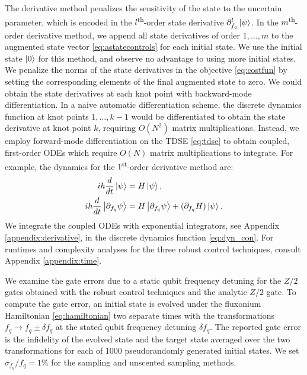 The derivative method penalizes the sensitivity of the state
to the uncertain parameter, which is encoded in the $l$\textsuperscript{th}-order
state derivative $\partial_{f_{q}}^{l} \ket{\psi}$. In the $m$\textsuperscript{th}-order
derivative method, we append all state derivatives of order $1, \dots, m$
to the augmented state vector \eqref{eq:astatecontrols}
for each initial state. We use the initial state $\ket{0}$ for this method,
and observe no advantage to using more initial states.
We penalize the norms of the state derivatives
in the objective \eqref{eq:costfun} by setting the corresponding elements
of the final augmented state to zero.
We could obtain the state derivatives at each knot point
with backward-mode differentiation.
In a naive automatic differentiation scheme,
the discrete dynamics function at knot points
$1, \dots, k - 1$ would be differentiated to obtain the state
derivative at knot point $k$, requiring
$O(N^{2})$ matrix multiplications. Instead, we 
employ forward-mode differentiation on the TDSE \eqref{eq:tdse}
to obtain coupled, first-order ODEs
which require $O(N)$ matrix multiplications to integrate.
For example, the dynamics for the $1$\textsuperscript{st}-order derivative method are:
\begin{align}
  i \hbar \frac{d}{dt} \ket{\psi} &= H \ket{\psi},\\
  i \hbar \frac{d}{dt} \ket{\partial_{f_{q}}\psi} &=
  H \ket{\partial_{f_{q}} \psi} +
  (\partial_{f_{q}} H) \ket{\psi}.
  \label{eq:d1dyn}
\end{align}
We integrate the coupled ODEs with exponential
integrators, see Appendix \ref{appendix:derivative},
in the discrete dynamics function \eqref{eq:dyn_con}. For runtimes
and complexity analyses for the three robust control techniques,
consult Appendix \ref{appendix:time}.

We examine the gate errors due to a static qubit frequency
detuning for the $Z/2$ gates obtained with the robust control techniques
and the analytic $Z/2$ gate.
To compute the gate error,
an initial state is evolved
under the fluxonium Hamiltonian \eqref{eq:hamiltonian}
two separate times with the transformations
$f_{q} \rightarrow f_{q} \pm \delta f_{q}$
at the stated qubit frequency detuning $\delta f_{q}$.
The reported gate error is the infidelity of
the evolved state and the target state averaged over
the two transformations for each of $1000$ pseudorandomly
generated initial states.
We set $\sigma_{f_{q}}/f_{q} = 1\%$
for the sampling and unscented sampling
methods.

